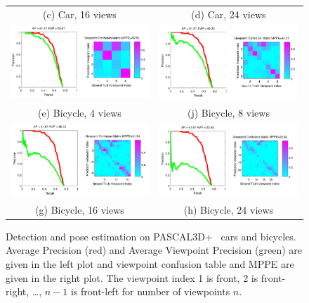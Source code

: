 \documentclass[10pt,twocolumn,letterpaper]{article}
\begin{document}
\begin{figure}[h]
\begin{tabular}{cc}
    (c) Car, 16 views&
    (d) Car, 24 views\\
  \includegraphics[width=0.45\linewidth]{supp/bicycle_cnn4_crop.png}&
  \includegraphics[width=0.45\linewidth]{supp/bicycle_cnn8_crop.png}\\
    (e) Bicycle, 4 views&
    (j) Bicycle, 8 views\\  
  \includegraphics[width=0.45\linewidth]{supp/bicycle_cnn16_crop.png}&
  \includegraphics[width=0.45\linewidth]{supp/bicycle_cnn24_crop.png}\\
    (g) Bicycle, 16 views&
    (h) Bicycle, 24 views\\
  \end{tabular}
  \caption{Detection and pose estimation on PASCAL3D+~\cite{Xiang14}
    cars and bicycles.
    Average Precision (red) and Average Viewpoint Precision (green)
    are given in the left plot and viewpoint confusion table and MPPE
    are given in the right plot. The viewpoint index 1 is front, 2 is
    front-right, \dots, $n-1$ is front-left for number of viewpoints $n$.}
  \label{fig:pascal_ap}
\end{figure}
\end{document}
